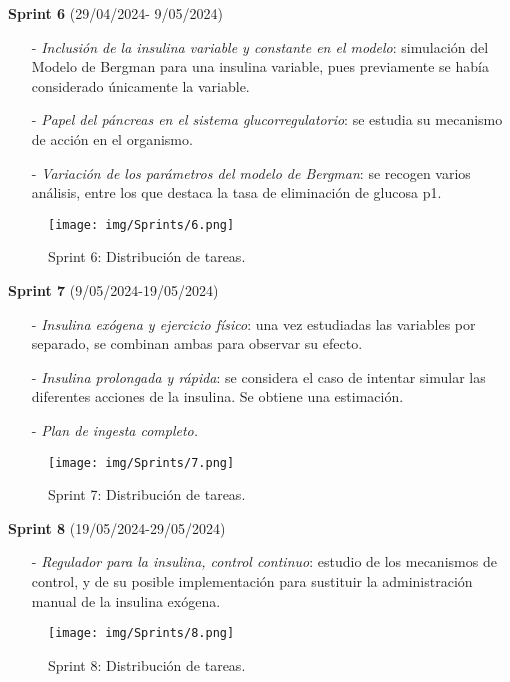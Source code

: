 \textbf{Sprint 6} (29/04/2024- 9/05/2024)
\begin{enumerate}
    \item[-] \textit{Inclusión de la insulina variable y constante en el modelo}: simulación del Modelo de Bergman para una insulina variable, pues previamente se había considerado únicamente la variable.
    \item[-] \textit{Papel del páncreas en el sistema glucorregulatorio}: se estudia su mecanismo de acción en el organismo.
    \item[-]  \textit{Variación de los parámetros del modelo de Bergman}: se recogen varios análisis, entre los que destaca la tasa de eliminación de glucosa p1.
\end{enumerate}
\clearpage
\begin{figure}[htbp]
    \centering
    \texttt{[image: img/Sprints/6.png]}
    \caption{Sprint 6: Distribución de tareas.}
    \label{fig:sprint6}
\end{figure}

\textbf{Sprint 7} (9/05/2024-19/05/2024)
\begin{enumerate}
    \item[-] \textit{Insulina exógena y ejercicio físico}: una vez estudiadas las variables por separado, se combinan ambas para observar su efecto.
    \item[-] \textit{Insulina prolongada y rápida}: se considera el caso de intentar simular las diferentes acciones de la insulina. Se obtiene una estimación.
    \item[-]  \textit{Plan de ingesta completo.}
\end{enumerate}

\begin{figure}[htbp]
    \centering
    \texttt{[image: img/Sprints/7.png]}
    \caption{Sprint 7: Distribución de tareas.}
    \label{fig:sprint7}
\end{figure}
\clearpage
\textbf{Sprint 8} (19/05/2024-29/05/2024)
\begin{enumerate}
    \item[-] \textit{Regulador para la insulina, control continuo}: estudio de los mecanismos de control, y de su posible implementación para sustituir la administración manual de la insulina exógena.
\end{enumerate}

\begin{figure}[htbp]
    \centering
    \texttt{[image: img/Sprints/8.png]}
    \caption{Sprint 8: Distribución de tareas.}
    \label{fig:sprint8}
\end{figure}

